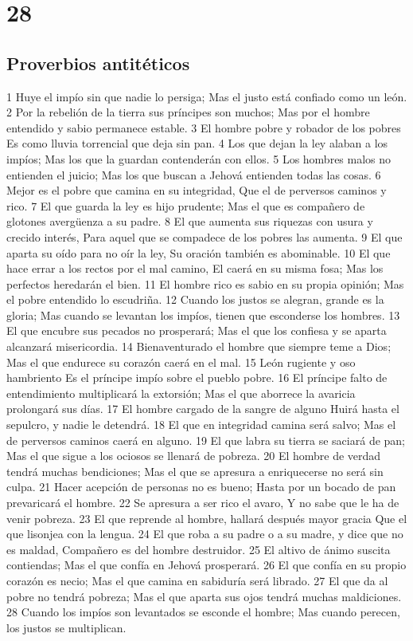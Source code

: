 \chapter{28}

\section*{Proverbios antitéticos}

1 Huye el impío sin que nadie lo persiga;
Mas el justo está confiado como un león.
2 Por la rebelión de la tierra sus príncipes son muchos;
Mas por el hombre entendido y sabio permanece estable.
3 El hombre pobre y robador de los pobres
Es como lluvia torrencial que deja sin pan.
4 Los que dejan la ley alaban a los impíos; 
Mas los que la guardan contenderán con ellos.
5 Los hombres malos no entienden el juicio;
Mas los que buscan a Jehová entienden todas las cosas.
6 Mejor es el pobre que camina en su integridad,
Que el de perversos caminos y rico.
7 El que guarda la ley es hijo prudente;
Mas el que es compañero de glotones avergüenza a su padre.
8 El que aumenta sus riquezas con usura y crecido interés,
Para aquel que se compadece de los pobres las aumenta.
9 El que aparta su oído para no oír la ley,
Su oración también es abominable.
10 El que hace errar a los rectos por el mal camino,
El caerá en su misma fosa;
Mas los perfectos heredarán el bien.
11 El hombre rico es sabio en su propia opinión;
Mas el pobre entendido lo escudriña.
12 Cuando los justos se alegran, grande es la gloria;
Mas cuando se levantan los impíos, tienen que esconderse los hombres.
13 El que encubre sus pecados no prosperará;
Mas el que los confiesa y se aparta alcanzará misericordia.
14 Bienaventurado el hombre que siempre teme a Dios;
Mas el que endurece su corazón caerá en el mal.
15 León rugiente y oso hambriento
Es el príncipe impío sobre el pueblo pobre.
16 El príncipe falto de entendimiento multiplicará la extorsión;
Mas el que aborrece la avaricia prolongará sus días.
17 El hombre cargado de la sangre de alguno
Huirá hasta el sepulcro, y nadie le detendrá.
18 El que en integridad camina será salvo;
Mas el de perversos caminos caerá en alguno.
19 El que labra su tierra se saciará de pan;
Mas el que sigue a los ociosos se llenará de pobreza.
20 El hombre de verdad tendrá muchas bendiciones;
Mas el que se apresura a enriquecerse no será sin culpa.
21 Hacer acepción de personas no es bueno;
Hasta por un bocado de pan prevaricará el hombre.
22 Se apresura a ser rico el avaro,
Y no sabe que le ha de venir pobreza.
23 El que reprende al hombre, hallará después mayor gracia
Que el que lisonjea con la lengua.
24 El que roba a su padre o a su madre, y dice que no es maldad,
Compañero es del hombre destruidor.
25 El altivo de ánimo suscita contiendas;
Mas el que confía en Jehová prosperará.
26 El que confía en su propio corazón es necio;
Mas el que camina en sabiduría será librado.
27 El que da al pobre no tendrá pobreza;
Mas el que aparta sus ojos tendrá muchas maldiciones.
28 Cuando los impíos son levantados se esconde el hombre;
Mas cuando perecen, los justos se multiplican. 


